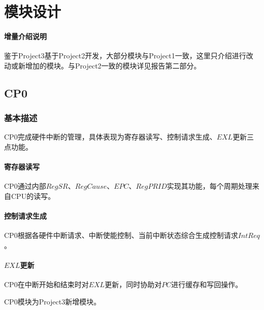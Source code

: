 \documentclass[main.tex]{subfiles}
\begin{document}
\section{模块设计}

\paragraph{增量介绍说明}
鉴于Project3基于Project2开发，大部分模块与Project1一致，这里只介绍进行改动或新增加的模块。与Project2一致的模块详见报告第二部分。

\subsection{CP0}

\subsubsection{基本描述}
CP0完成硬件中断的管理，具体表现为寄存器读写、控制请求生成、$EXL$更新三点功能。

\paragraph{寄存器读写}
CP0通过内部$RegSR$、$RegCause$、$EPC$、$RegPRID$实现其功能，每个周期处理来自CPU的读写。

\paragraph{控制请求生成}
CP0根据各硬件中断请求、中断使能控制、当前中断状态综合生成控制请求$IntReq$。

\paragraph{$EXL$更新}
CP0在中断开始和结束时对$EXL$更新，同时协助对$PC$进行缓存和写回操作。

CP0模块为Project3新增模块。
\end{document}
